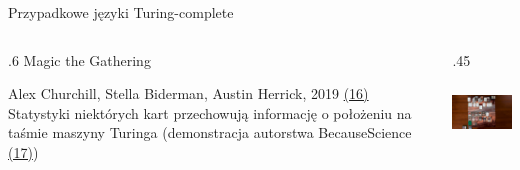 \begin{frame}{Przypadkowe języki Turing-complete}
    \begin{columns}
        \begin{column}{.6\hsize}
            {Magic the Gathering}
            {\footnotesize
            \begin{itemize}
                \myitem Alex Churchill, Stella Biderman, Austin Herrick, 2019 {\color{blue} \hyperlink{frame:przypisy}{(16)}}
                \myitem Statystyki niektórych kart przechowują informację o położeniu na taśmie maszyny Turinga (demonstracja autorstwa BecauseScience {\color{blue} \hyperlink{frame:przypisy}{(17)}})
            \end{itemize}
            }
        \end{column}
        \begin{column}{.45\hsize}
            {\hspace{0cm}\includegraphics[height=2.2cm]{figures/turing_mtg.png}}
        \end{column}
    \end{columns}

\end{frame}
